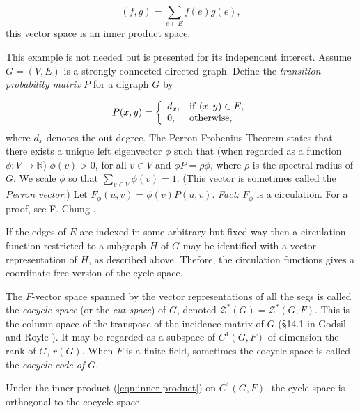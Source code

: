 \begin{equation}
(f,g)=\sum_{e\in E} f(e)g(e),
\end{equation}
this vector space is an inner product space.

\begin{example}
{\rm
This example is not needed but is presented for its independent
interest. Assume $G=(V,E)$ is a strongly connected directed graph.
Define the {\it transition probability matrix} $P$ for a digraph
$G$ by

\[
P(x,y)=\left\{
\begin{array}{ll}
d_x, & {\rm if}\ (x, y) \in E,\\
0, & {\rm otherwise},
\end{array}
\right.
\]
where $d_x$ denotes the out-degree.
The Perron-Frobenius Theorem states that there exists a unique
left eigenvector $\phi$ such that (when regarded as a function
$\phi:V\to {\mathbb{R}}$) $\phi (v) > 0$, for all $v\in V$ and
$\phi P  = \rho \phi$, where $\rho$ is the spectral radius of
$G$. We scale $\phi$ so that $\sum_{v\in V}  \phi(v) = 1$.
(This vector is sometimes called the {\it Perron vector}.)
 Let $F_\phi (u, v) = \phi(v)P (u, v)$.
{\it Fact:} $F_\phi$ is a circulation.
For a proof, see F. Chung \cite{Chung2005}.
}
\end{example}

 If the edges of $E$ are indexed in some arbitrary but fixed way then
 a circulation function restricted to a subgraph $H$ of $G$
 may be identified with a vector representation of $H$,
 as described above. Thefore, the circulation functions gives a
 coordinate-free version of the cycle space.

The $F$-vector space spanned by the vector representations of
all the segs is called the {\it cocycle space} (or the {\it cut space}) of $G$,
denoted ${\mathcal Z}^*(G)={\mathcal Z}^*(G,F)$.
This is the column space of the transpose of the incidence
matrix of $G$ (\S 14.1 in Godsil and Royle \cite{GodsilRoyle2004}). It may be
regarded as a subspace of $C^1(G,F)$ of dimension the rank of $G$,
$r(G)$.
When $F$ is a finite field, sometimes the cocycle space is called
the {\it cocycle code of $G$}.

\begin{lemma}
\label{lemma:cycle-cocycle}
{\rm
Under the inner product (\ref{eqn:inner-product})
on $C^1(G,F)$, the cycle space is orthogonal to the cocycle space.
}
\end{lemma}


